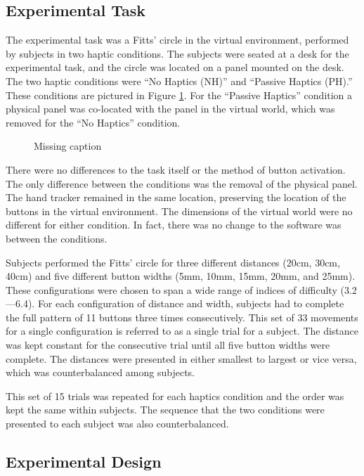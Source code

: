 \subsection{Experimental Task}

The experimental task was a Fitts' circle in the virtual environment, performed by subjects in two haptic conditions.
The subjects were seated at a desk for the experimental task, and the circle was located on a panel mounted on the desk.
The two haptic conditions were ``No Haptics (NH)'' and ``Passive Haptics (PH).''
These conditions are pictured in Figure \ref{fig:ph_conditions}.
For the ``Passive Haptics'' condition a physical panel was co-located with the panel in the virtual world, which was removed for the ``No Haptics'' condition.

\begin{figure}
    \centering
    \caption{Missing caption}
    \label{fig:ph_conditions}
\end{figure}

There were no differences to the task itself or the method of button activation.
The only difference between the conditions was the removal of the physical panel.
The hand tracker remained in the same location, preserving the location of the buttons in the virtual environment.
The dimensions of the virtual world were no different for either condition.
In fact, there was no change to the software was between the conditions.

Subjects performed the Fitts' circle for three different distances (20cm, 30cm, 40cm) and five different button widths (5mm, 10mm, 15mm, 20mm, and 25mm).
These configurations were chosen to span a wide range of indices of difficulty (3.2---6.4).
For each configuration of distance and width, subjects had to complete the full pattern of 11 buttons three times consecutively.
This set of 33 movements for a single configuration is referred to as a single trial for a subject.
The distance was kept constant for the consecutive trial until all five button widths were complete.
The distances were presented in either smallest to largest or vice versa, which was counterbalanced among subjects.

This set of 15 trials was repeated for each haptics condition and the order was kept the same within subjects.
The sequence that the two conditions were presented to each subject was also counterbalanced.

\subsection{Experimental Design}

